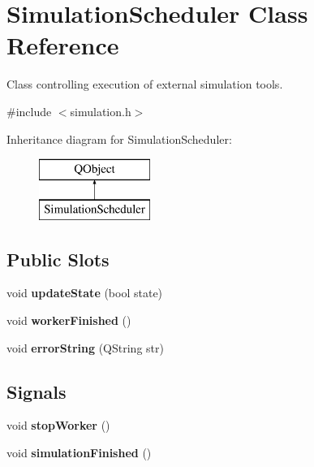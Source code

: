 \hypertarget{class_simulation_scheduler}{}\section{Simulation\+Scheduler Class Reference}
\label{class_simulation_scheduler}


Class controlling execution of external simulation tools.  




{\ttfamily \#include $<$simulation.\+h$>$}

Inheritance diagram for Simulation\+Scheduler\+:\begin{figure}[H]
\begin{center}
\leavevmode
\includegraphics[height=2.000000cm]{class_simulation_scheduler}
\end{center}
\end{figure}
\subsection*{Public Slots}
\begin{DoxyCompactItemize}
\item 
\hypertarget{class_simulation_scheduler_ae48b5f2f68304c077d890c4dbe882e4f}{}\label{class_simulation_scheduler_ae48b5f2f68304c077d890c4dbe882e4f} 
void {\bfseries update\+State} (bool state)
\item 
\hypertarget{class_simulation_scheduler_a060a51e44f3f6e51b1631fc3a41194d0}{}\label{class_simulation_scheduler_a060a51e44f3f6e51b1631fc3a41194d0} 
void {\bfseries worker\+Finished} ()
\item 
\hypertarget{class_simulation_scheduler_a27ad04f596b98dcf32e02fe0104a062b}{}\label{class_simulation_scheduler_a27ad04f596b98dcf32e02fe0104a062b} 
void {\bfseries error\+String} (Q\+String str)
\end{DoxyCompactItemize}
\subsection*{Signals}
\begin{DoxyCompactItemize}
\item 
\hypertarget{class_simulation_scheduler_a0984b261f42cb46e75c4042349922e19}{}\label{class_simulation_scheduler_a0984b261f42cb46e75c4042349922e19} 
void {\bfseries stop\+Worker} ()
\item 
\hypertarget{class_simulation_scheduler_a1b99e3a87e300443f93c9e5a37f81530}{}\label{class_simulation_scheduler_a1b99e3a87e300443f93c9e5a37f81530} 
void {\bfseries simulation\+Finished} ()
\end{DoxyCompactItemize}
